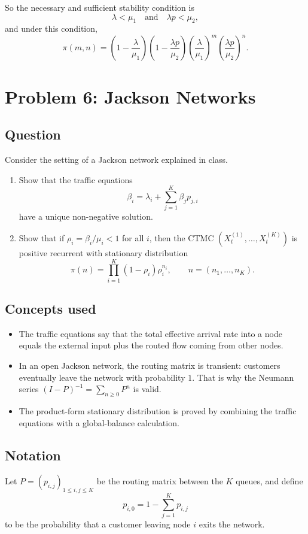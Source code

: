 \documentclass[11pt,a4paper]{article}
\newcommand{\1}{\mathbf{1}}
\begin{document}
So the necessary and sufficient stability condition is
\[
\boxed{\lambda<\mu_1\quad \text{and}\quad \lambda p<\mu_2,}
\]
and under this condition,
\[
\boxed{\pi(m,n)=\left(1-\frac{\lambda}{\mu_1}\right)\left(1-\frac{\lambda p}{\mu_2}\right)
\left(\frac{\lambda}{\mu_1}\right)^m
\left(\frac{\lambda p}{\mu_2}\right)^n.}
\]

\section{Problem 6: Jackson Networks}
\subsection*{Question}
Consider the setting of a Jackson network explained in class.

\begin{enumerate}[label=\textbf{(\alph*)}]
  \item Show that the traffic equations
  \[
  \beta_i=\lambda_i+\sum_{j=1}^K \beta_j p_{j,i}
  \]
  have a unique non-negative solution.
  \item Show that if $\rho_i=\beta_i/\mu_i<1$ for all $i$, then the CTMC $(X_t^{(1)},\dots,X_t^{(K)})$ is positive recurrent with stationary distribution
  \[
  \pi(n)=\prod_{i=1}^K (1-\rho_i)\rho_i^{n_i},
  \qquad n=(n_1,\dots,n_K).
  \]
\end{enumerate}

\subsection*{Concepts used}
\begin{itemize}
  \item The traffic equations say that the total effective arrival rate into a node equals the external input plus the routed flow coming from other nodes.
  \item In an open Jackson network, the routing matrix is transient: customers eventually leave the network with probability $1$. That is why the Neumann series $(I-P)^{-1}=\sum_{n\ge 0}P^n$ is valid.
  \item The product-form stationary distribution is proved by combining the traffic equations with a global-balance calculation.
\end{itemize}

\subsection*{Notation}
Let $P=(p_{i,j})_{1\le i,j\le K}$ be the routing matrix between the $K$ queues, and define
\[
p_{i,0}=1-\sum_{j=1}^K p_{i,j}
\]
to be the probability that a customer leaving node $i$ exits the network.
\end{document}
